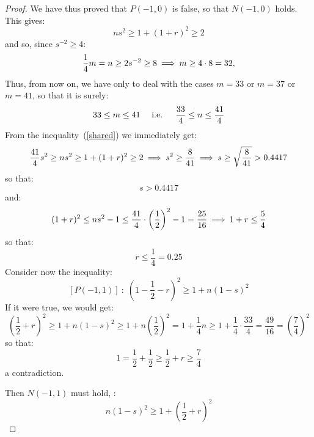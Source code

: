 \begin{proof}
We have thus proved that $P(-1, 0)$ is false, so that
$N(-1, 0)$ holds. This gives:
%
\begin{equation}\label{shared}
ns^2 \geq 1 + (1 + r)^2 \geq 2
\end{equation}
and so, since $s^{-2} \geq 4$:
$$
\frac{1}{4}m = n \geq 2s^{-2} \geq 8 \:\Longrightarrow\:
m \geq 4 \cdot 8 = 32,
$$
%
Thus, from now on, we have only to deal with the cases
$m = 33$ or $m = 37$ or $m = 41$, so that it is surely:
\begin{equation}\label{m_and_n_bounds}
33 \leq m \leq 41 \quad~ \text{i.e.\ } \quad~\!
\frac{33}{4} \leq n \leq \frac{41}{4}
\end{equation}
%
From the inequality~(\ref{shared}) we immediately get:
$$
\frac{41}{4}s^2 \geq ns^2 \geq 1 + (1 + r)^2 \geq 2 \:\Longrightarrow\:
s^2 \geq \frac{8}{41} \:\Longrightarrow\: s \geq \sqrt{\frac{8}{41}} >
0.4417
$$
so that:
\begin{equation}\label{s_lower_bound}
s > 0.4417
\end{equation}
and:
$$
(1 + r)^2 \leq ns^2 - 1 \leq \frac{41}{4} \cdot
\left(\frac{1}{2}\right)^2 - 1 = \frac{25}{16} \:\Longrightarrow\:
1 + r \leq \frac{5}{4}
$$
so that:
\begin{equation}\label{r_upper_bound}
r \leq \frac{1}{4} = 0.25
\end{equation}
%
Consider now the inequality:
$$
\left[P(-1, 1)\right]\::\;
\left(1 - \frac{1}{2} - r\right)^2 \geq 1 + n(1 - s)^2
$$
If it were true, we would get:
$$
\left(\frac{1}{2} + r\right)^2 \geq 1 + n(1 - s)^2 \geq
1 + n\left(\frac{1}{2}\right)^2 = 1 + \frac{1}{4}n
\geq 1 + \frac{1}{4} \cdot \frac{33}{4} = \frac{49}{16}
= \left(\frac{7}{4}\right)^2
$$
so that:
$$
1 = \frac{1}{2} + \frac{1}{2}  \geq \frac{1}{2} + r \geq \frac{7}{4}
$$
a contradiction.

Then $N(-1, 1)$ must hold, \ie:
\begin{equation}\label{N(-1,1)}
n(1 - s)^2 \geq 1 + \left(\frac{1}{2} + r\right)^2
\end{equation}


\end{proof}
